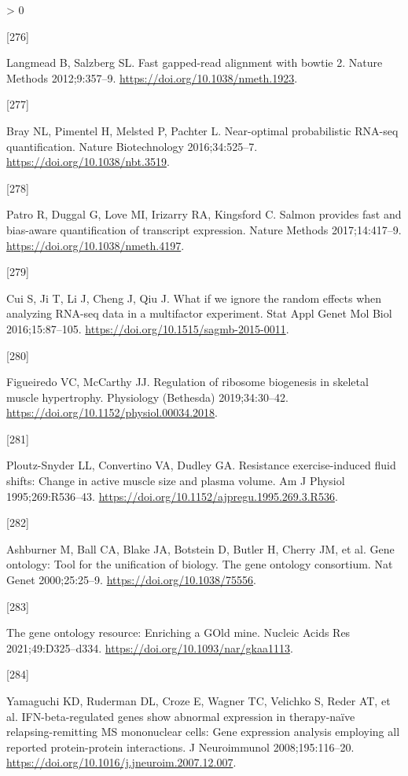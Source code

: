 \documentclass[twoside,10pt]{gihclass} %
\newlength{\cslhangindent}
\newlength{\csllabelwidth}
\newenvironment{CSLReferences}[3] %
 {%
  \setlength{\parindent}{0pt}
  \ifodd #1 \everypar{\setlength{\hangindent}{\cslhangindent}}\ignorespaces\fi
  \ifnum #2 > 0
  \setlength{\parskip}{#2\baselineskip}
  \fi
 }%
 {}
\newcommand{\CSLLeftMargin}[1]{\parbox[t]{\maxof{\widthof{#1}}{\csllabelwidth}}{#1}}
\newcommand{\CSLRightInline}[1]{\parbox[t]{\linewidth}{#1}}
\begin{document}
\begin{CSLReferences}{0}{0}
\leavevmode\hypertarget{ref-RN2388}{}%
\CSLLeftMargin{{[}276{]} }
\CSLRightInline{Langmead B, Salzberg SL. Fast gapped-read alignment with bowtie 2. Nature Methods 2012;9:357--9. \url{https://doi.org/10.1038/nmeth.1923}.}

\leavevmode\hypertarget{ref-RN2389}{}%
\CSLLeftMargin{{[}277{]} }
\CSLRightInline{Bray NL, Pimentel H, Melsted P, Pachter L. Near-optimal probabilistic RNA-seq quantification. Nature Biotechnology 2016;34:525--7. \url{https://doi.org/10.1038/nbt.3519}.}

\leavevmode\hypertarget{ref-RN2390}{}%
\CSLLeftMargin{{[}278{]} }
\CSLRightInline{Patro R, Duggal G, Love MI, Irizarry RA, Kingsford C. Salmon provides fast and bias-aware quantification of transcript expression. Nature Methods 2017;14:417--9. \url{https://doi.org/10.1038/nmeth.4197}.}

\leavevmode\hypertarget{ref-RN2366}{}%
\CSLLeftMargin{{[}279{]} }
\CSLRightInline{Cui S, Ji T, Li J, Cheng J, Qiu J. What if we ignore the random effects when analyzing RNA-seq data in a multifactor experiment. Stat Appl Genet Mol Biol 2016;15:87--105. \url{https://doi.org/10.1515/sagmb-2015-0011}.}

\leavevmode\hypertarget{ref-RN2142}{}%
\CSLLeftMargin{{[}280{]} }
\CSLRightInline{Figueiredo VC, McCarthy JJ. Regulation of ribosome biogenesis in skeletal muscle hypertrophy. Physiology (Bethesda) 2019;34:30--42. \url{https://doi.org/10.1152/physiol.00034.2018}.}

\leavevmode\hypertarget{ref-RN2270}{}%
\CSLLeftMargin{{[}281{]} }
\CSLRightInline{Ploutz-Snyder LL, Convertino VA, Dudley GA. Resistance exercise-induced fluid shifts: Change in active muscle size and plasma volume. Am J Physiol 1995;269:R536--43. \url{https://doi.org/10.1152/ajpregu.1995.269.3.R536}.}

\leavevmode\hypertarget{ref-RN2889}{}%
\CSLLeftMargin{{[}282{]} }
\CSLRightInline{Ashburner M, Ball CA, Blake JA, Botstein D, Butler H, Cherry JM, et al. Gene ontology: Tool for the unification of biology. The gene ontology consortium. Nat Genet 2000;25:25--9. \url{https://doi.org/10.1038/75556}.}

\leavevmode\hypertarget{ref-RN2890}{}%
\CSLLeftMargin{{[}283{]} }
\CSLRightInline{The gene ontology resource: Enriching a GOld mine. Nucleic Acids Res 2021;49:D325--d334. \url{https://doi.org/10.1093/nar/gkaa1113}.}

\leavevmode\hypertarget{ref-RN2439}{}%
\CSLLeftMargin{{[}284{]} }
\CSLRightInline{Yamaguchi KD, Ruderman DL, Croze E, Wagner TC, Velichko S, Reder AT, et al. IFN-beta-regulated genes show abnormal expression in therapy-naïve relapsing-remitting MS mononuclear cells: Gene expression analysis employing all reported protein-protein interactions. J Neuroimmunol 2008;195:116--20. \url{https://doi.org/10.1016/j.jneuroim.2007.12.007}.}


\end{CSLReferences}
\end{document}

